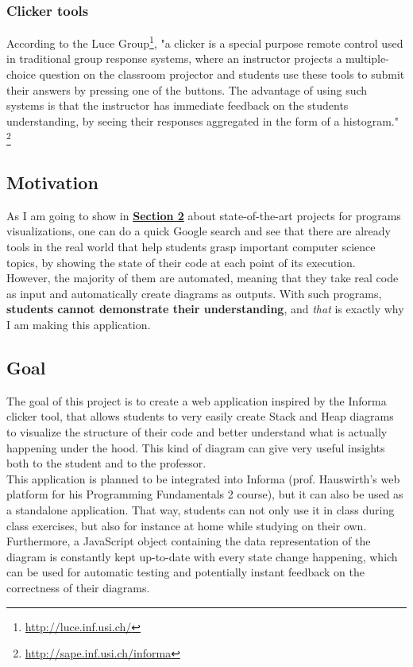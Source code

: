 \documentclass[]{usiinfbachelorproject}
\begin{document}
\vspace{\fill}
\pagebreak
 
\subsubsection{Clicker tools}
 
According to the Luce Group\footnote{\url{http://luce.inf.usi.ch/}}, "a clicker is a special purpose remote control used in traditional group response systems, where an instructor projects a multiple-choice question on the classroom projector and students use these tools to submit their answers by pressing one of the buttons. The advantage of using such systems is that the instructor has immediate feedback on the students understanding, by seeing their responses aggregated in the form of a histogram." \footnote{\url{http://sape.inf.usi.ch/informa}}
 
\subsection{Motivation}

As I am going to show in \hyperref[state]{\textbf{Section 2}} about state-of-the-art projects for programs visualizations, one can do a quick Google search and see that there are already tools in the real world that help students grasp important computer science topics, by showing the state of their code at each point of its execution.\\
However, the majority of them are automated, meaning that they take real code as input and automatically create diagrams as outputs. With such programs, \textbf{students cannot demonstrate their understanding}, and \emph{that} is exactly why I am making this application.

\subsection{Goal} \label{goal}

The goal of this project is to create a web application inspired by the Informa clicker tool, that allows students to very easily create Stack and Heap diagrams to visualize the structure of their code and better understand what is actually happening under the hood. This kind of diagram can give very useful insights both to the student and to the professor.\\ This application is planned to be integrated into Informa (prof. Hauswirth's web platform for his Programming Fundamentals 2 course), but it can also be used as a standalone application. That way, students can not only use it in class during class exercises, but also for instance at home while studying on their own.\\
Furthermore, a JavaScript object containing the data representation of the diagram is constantly kept up-to-date with every state change happening, which can be used for automatic testing and potentially instant feedback on the correctness of their diagrams.
\end{document}
